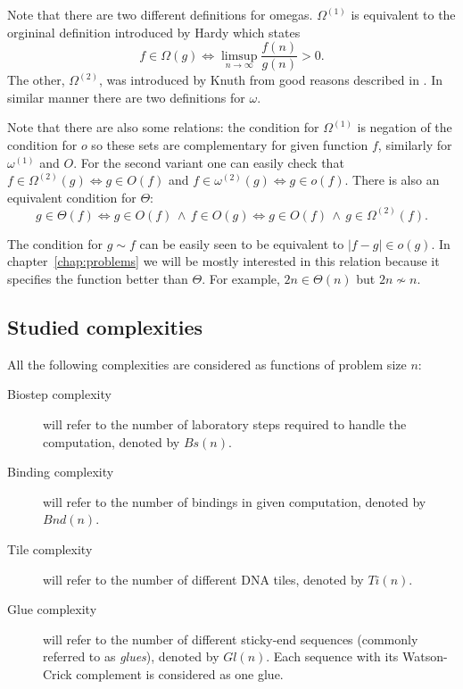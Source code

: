 		\begin{remark}
			Note that there are two different definitions for omegas. $\Omega^{(1)}$ is equivalent to the orgininal definition introduced by Hardy \cite{hardy1914} which states
			\begin{equation*}
				f \in \Omega(g) \iff \limsup\limits_{n\to\infty}\frac{f(n)}{g(n)} > 0 .
			\end{equation*}
			The other, $\Omega^{(2)}$, was introduced by Knuth from good reasons described in \cite{knuth76}. In similar manner there are two definitions for $\omega$.
			
			Note that there are also some relations: the condition for $\Omega^{(1)}$ is negation of the condition for $o$ so these sets are complementary for given function $f$, similarly for $\omega^{(1)}$ and $O$. For the second variant one can easily check that $f\in\Omega^{(2)}(g)\iff g\in O(f)$ and $f\in\omega^{(2)}(g)\iff g\in o(f)$. There is also an equivalent condition for $\Theta$:
			\begin{equation*}
				g \in \Theta(f) \iff g \in O(f) \,\wedge\, f \in O(g) \iff g \in O(f) \,\wedge\, g \in \Omega^{(2)}(f) .
			\end{equation*}
			
			The condition for $g \sim f$ can be easily seen to be equivalent to $|f-g| \in o(g)$. In chapter~\ref{chap:problems} we will be mostly interested in this relation because it specifies the function better than $\Theta$. For example, $2n \in \Theta(n)$ but $2n \not\sim n$.
		\end{remark}
	
	\subsection{Studied complexities}
		
		\begin{defn}
			All the following complexities are considered as functions of problem size $n$:
			\begin{description}
				\item[Biostep complexity] will refer to the number of laboratory steps required to handle the computation, denoted by $Bs(n)$.
				\item[Binding complexity] will refer to the number of bindings in given computation, denoted by $Bnd(n)$.
				\item[Tile complexity] will refer to the number of different DNA tiles, denoted by $Ti(n)$.
				\item[Glue complexity] will refer to the number of different sticky-end sequences (commonly referred to as {\em glues}), denoted by $Gl(n)$. Each sequence with its Watson-Crick complement is considered as one glue.
			\end{description}
		\end{defn}
		
